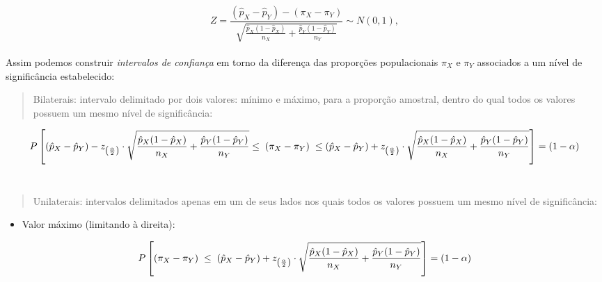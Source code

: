 \documentclass[
]{book}
\providecommand{\tightlist}{%
  \setlength{\itemsep}{0pt}\setlength{\parskip}{0pt}}
\begin{document}
\hfill\break

\[
Z=\frac{(\hat{p}_{X}-\hat{p}_{Y}  )- (\pi_{X}-\pi_{Y}) }{\sqrt{ \frac{\hat{p}_{X}(1-\hat{p}_{X})}{n_{X}}+ \frac{\hat{p}_{Y}(1-\hat{p}_{Y})}{n_{Y}}}} \sim N\left(0,1\right),
\]\\

Assim podemos construir \emph{intervalos de confiança} em torno da diferença das proporções populacionais \(\pi_{X}\) e \(\pi_{Y}\) associados a um nível de significância estabelecido:

\hfill\break

\begin{quote}
Bilaterais: intervalo delimitado por dois valores: mínimo e máximo, para a proporção amostral, dentro do qual todos os valores possuem um mesmo nível de significância:
\end{quote}

\hfill\break

\[
P\left[(\hat{p}_{X}-\hat{p}_{Y}) - {z}_{\left(\frac{\alpha }{2}\right)} \cdot  \sqrt{{\frac{\hat{p}_{X}(1-\hat{p}_{X})}{n_{X}}+ \frac{\hat{p}_{Y}(1-\hat{p}_{Y})}{n_{Y}}}} \\
\le \hspace{0.1cm}  (\pi_{X}-\pi_{Y}) \hspace{0.1cm} \le \hspace{0.1cm} \\
(\hat{p}_{X}-\hat{p}_{Y}) + {z}_{\left(\frac{\alpha }{2}\right)} \cdot \sqrt{{\frac{\hat{p}_{X}(1-\hat{p}_{X})}{n_{X}}+ \frac{\hat{p}_{Y}(1-\hat{p}_{Y})}{n_{Y}}}}\right] = (1-\alpha)
\]\\

\begin{quote}
Unilaterais: intervalos delimitados apenas em um de seus lados nos quais todos os valores possuem um mesmo nível de significância:
\end{quote}

\hfill\break

\begin{itemize}
\tightlist
\item
  Valor máximo (limitando à direita):
\end{itemize}

\hfill\break

\[
P\left[(\pi_{X}-\pi_{Y})  \hspace{0.1cm} \le \hspace{0.1cm} (\hat{p}_{X}-\hat{p}_{Y}) + {z}_{\left(\frac{\alpha }{2}\right)} \cdot \sqrt{{\frac{\hat{p}_{X}(1-\hat{p}_{X})}{n_{X}}+ \frac{\hat{p}_{Y}(1-\hat{p}_{Y})}{n_{Y}}}}\right] = (1-\alpha)
\]
\end{document}
